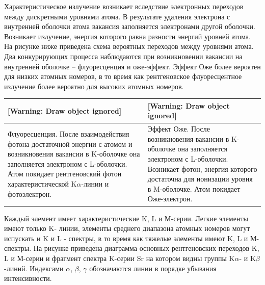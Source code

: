 \documentclass[a4paper,14pt, openany, twoside, draft]{extbook} %
\begin{document}
Характеристическое излучение возникает вследствие электронных переходов между дискретными уровнями атома. В результате удаления электрона с внутренней оболочки атома вакансия заполняется электронами другой оболочки. Возникает излучение, энергия которого равна разности энергий уровней атома. На рисунке ниже приведена схема вероятных переходов между уровнями атома. Два конкурирующих процесса наблюдаются при возникновении вакансии на внутренней оболочке – флуоресценция и оже-эффект. Эффект Оже более вероятен для низких атомных номеров, в то время как рентгеновское флуоресцентное излучение более вероятно для высоких атомных номеров.

\begin{flushleft}
\tablefirsthead{}
\tablehead{}
\tabletail{}
\tablelasttail{}
\begin{supertabular}{|m{6.866cm}|m{8.0130005cm}|}
\hline
{ [Warning: Draw object ignored]} &
{ [Warning: Draw object ignored]}\\\hline
{ Флуоресценция. После взаимодействия фотона достаточной энергии с атомом и возникновения вакансии в K{}-оболочке она заполняется электроном с L{}-оболочки. Атом покидает рентгеновский фотон характеристической K${\alpha}${}-линии и фотоэлектрон.} &
{ Эффект Оже. После возникновения вакансии в K{}-оболочке она заполняется электроном с L{}-оболочки. Возникает фотон, энергия которого достаточна для ионизации уровня в M{}-оболочке. Атом покидает Оже-электрон.}\\\hline
\end{supertabular}
\end{flushleft}
Каждый элемент имеет характеристические K, L и М-серии. Легкие элементы имеют только K- линии, элементы среднего  диапазона атомных номеров могут испускать и K и L - спектры, в то время как тяжелые элементы имеют K, L и М-спектры.  На рисунке приведена диаграмма основных рентгеновских переходов K, L и М-серии и фрагмент спектра K{}-серии Sr  на котором видны группы K${\alpha}${}- и K${\beta}${}-линий. Индексами ${\alpha}$, ${\beta}$, ${\gamma}$ обозначаются линии в порядке убывания интенсивности.
\end{document}
